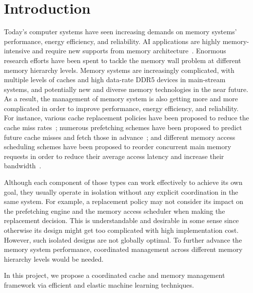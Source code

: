 \section{Introduction}
\label{sec:introduction}

Today's computer systems have seen increasing demands on memory systems'
performance, energy efficiency, and reliability. AI 
applications are highly memory-intensive and require new supports
from memory architecture~\cite{TechReview:Online-2026}.
Enormous research efforts have been spent to tackle the memory wall
problem at different memory hierarchy levels.  Memory
systems are increasingly complicated, with multiple levels of caches
and high data-rate DDR5 devices in main-stream systems, and potentially
new and diverse memory technologies in the near future.
As a result, the management of memory system
is also getting more and more complicated in order to improve
performance, energy efficiency, and reliability.  For instance,
various cache replacement policies have been proposed to reduce the cache miss
rates~\cite{Das:TACO-2015, Jaleel:ISCA-2010, Sethumurugan:HPCA-2021,
Shi:MICRO-2019, Wu:TACO-2011}; 
numerous prefetching schemes have been proposed to predict
future cache misses and fetch those in advance~\cite{Ai:MICRO-2025,
Ainsworth:ISCA-2024, Bakhshalipour:HPCA-2018, Bakhshalipour:HPCA-2019,
Bera:MICRO-2021, Bera:HPCA-2026, Bera:MICRO-2019, Chen:HPCA-2025,
Duong:ISCA-2024, He:MICRO-2025}; 
and different memory
access scheduling schemes have been proposed to reorder concurrent main memory
requests in order to reduce their average access latency and increase
their bandwidth~\cite{Rixner:ISCA-2000, Kim:HPCA-2010, Kim:MICRO-2010,
Mutlu:MICRO-2007, Mutlu:ISCA-2008, Shao:HPCA-2007, Subramanian:TPDS-2016}.

Although each component of those types can work
effectively to achieve its own goal, they usually operate in isolation
without any explicit coordination in the same system.  For example,
a replacement policy may not consider its impact on the prefetching
engine and the memory access scheduler when making the replacement decision.
This is understandable and desirable in some sense since otherwise
its design might get too complicated with high implementation cost.
However, such isolated designs are not globally optimal. To further
advance the memory system performance, coordinated management across
different memory hierarchy levels would be needed.

In this project, we propose a coordinated cache and memory management framework
via efficient and elastic machine learning techniques.

